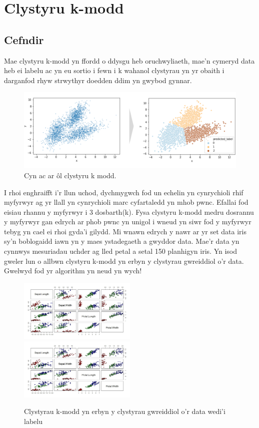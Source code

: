 \chapter{Clystyru k-modd}\label{cha:literature}
\section{Cefndir}\label{sec:axelrodoriginal}
Mae clystyru k-modd yn ffordd o ddysgu heb oruchwyliaeth, mae'n cymeryd data heb ei labelu ac yn eu sortio i fewn i k wahanol clystyrau yn yr obaith i darganfod rhyw strwythyr doedden ddim yn gwybod gynnar. 
\begin{figure}[h!]
\begin{center}
\includegraphics[width=0.7\linewidth]{../img/clystyrau_k_modd}
\caption{Cyn ac ar \^{o}l clystyru k modd.}
\end{center}
\end{figure}
I rhoi enghraifft i'r llun uchod, dychmygwch fod un echelin yn cynrychioli rhif myfyrwyr ag yr llall yn cynrychioli marc cyfartaledd yn mhob pwnc. Efallai fod eisiau rhannu y myfyrwyr i 3 dosbarth(k). Fysa clystyru k-modd medru dosrannu y myfyrwyr gan edrych ar phob pwnc yn unigol i wneud yn siwr fod y myfyrwyr tebyg yn cael ei rhoi gyda'i gilydd. Mi wnawn edrych y nawr ar yr set data iris sy'n boblogaidd iawn yn y maes ystadegaeth a gwyddor data. Mae'r data yn cynnwys mesuriadau uchder ag lled petal a setal 150 planhigyn iris. Yn isod gweler lun o allbwn clystyru k-modd yn erbyn y clystyrau gwreiddiol o'r data. Gwelwyd fod yr algorithm yn neud yn wych! 
\begin{figure}[h!]
\begin{center}
\includegraphics[width=0.5\textwidth]{../img/enghraifftclystyru.jpeg}
\includegraphics[width=0.5\textwidth]{../img/Actualclassification.jpeg}
\caption{Clystyrau k-modd yn erbyn y clystyrau gwreiddiol o'r data wedi'i labelu}
\end{center}
\end{figure}
